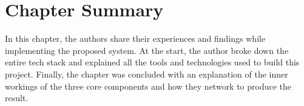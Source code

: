 \section{Chapter Summary}

In this chapter, the authors share their experiences and findings while implementing the proposed system. At the start, the author broke down the entire tech stack and explained all the tools and technologies used to build this project. Finally, the chapter was concluded with an explanation of the inner workings of the three core components and how they network to produce the result.